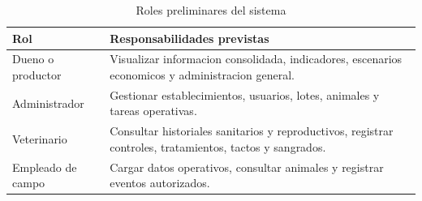 \begin{table}[t]
	\caption{Roles preliminares del sistema}
	\label{tab:roles}
	\centering
	\begin{tabular}{|p{}|p{}|}
		\hline
		\textbf{Rol} & \textbf{Responsabilidades previstas} \\
		\hline
		Dueno o productor & Visualizar informacion consolidada, indicadores, escenarios economicos y administracion general. \\
		\hline
		Administrador & Gestionar establecimientos, usuarios, lotes, animales y tareas operativas. \\
		\hline
		Veterinario & Consultar historiales sanitarios y reproductivos, registrar controles, tratamientos, tactos y sangrados. \\
		\hline
		Empleado de campo & Cargar datos operativos, consultar animales y registrar eventos autorizados. \\
		\hline
	\end{tabular}
\end{table}
